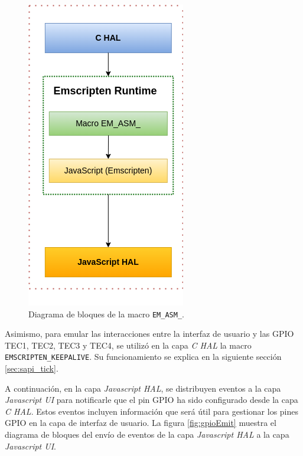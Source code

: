 \begin{figure}[ht]
	\centering
	\includegraphics[scale=.40]{./Figures/gpioEmscripten.png}
	\caption{Diagrama de bloques de la macro \texttt{EM\_ASM\_}.}
	\label{fig:gpioEmscripten}
\end{figure}

Asimismo, para emular las interacciones entre la interfaz de usuario y las GPIO TEC1, TEC2, TEC3 y TEC4, se utilizó en la capa \textit{C HAL} la macro \newline \texttt{EMSCRIPTEN\_KEEPALIVE}. Su funcionamiento se explica en la siguiente sección \ref{sec:sapi_tick}. 

A continuación, en la capa \textit{Javascript HAL}, se distribuyen eventos a la capa \textit{Javascript UI} para notificarle que el pin GPIO ha sido configurado desde la capa \textit{C HAL}. Estos eventos incluyen información que será útil para gestionar los pines GPIO en la capa de interfaz de usuario. La figura \ref{fig:gpioEmit} muestra el diagrama de bloques del envío de eventos de la capa \textit{Javascript HAL} a la capa \textit{Javascript UI}.

